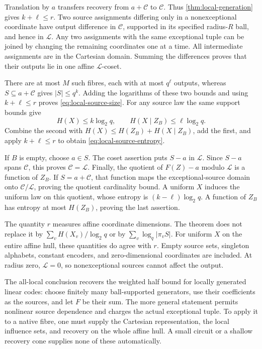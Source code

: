 \begin{informalproof}
Translation by $a$ transfers recovery from $a+\mathcal C$ to
$\mathcal C$. Thus \cref{thm:local-generation} gives $k+\ell\le r$.
Two source assignments differing only in a nonexceptional coordinate
have output difference in $\mathcal C$, supported in its specified
radius-$R$ ball, and hence in $\mathcal L$. Any two assignments with
the same exceptional tuple can be joined by changing the remaining
coordinates one at a time. All intermediate assignments are in the
Cartesian domain. Summing the differences proves that their outputs
lie in one affine $\mathcal L$-coset.

There are at most $M$ such fibres, each with at most $q^\ell$ outputs,
whereas $S\subseteq a+\mathcal C$ gives $|S|\le q^k$. Adding the
logarithms of these two bounds and using $k+\ell\le r$ proves
\eqref{eq:local-source-size}. For any source law the same support
bounds give
\[
 H(X)\le k\log_2q,\qquad
 H(X\mid Z_B)\le\ell\log_2q.
\]
Combine the second with $H(X)\le H(Z_B)+H(X\mid Z_B)$, add the first,
and apply $k+\ell\le r$ to obtain \eqref{eq:local-source-entropy}.

If $B$ is empty, choose $a\in S$. The coset assertion puts
$S-a$ in $\mathcal L$. Since $S-a$ spans $\mathcal C$, this proves
$\mathcal C=\mathcal L$. Finally, the quotient of $F(Z)-a$ modulo
$\mathcal L$ is a function of $Z_B$. If $S=a+\mathcal C$, that
function maps the exceptional-source domain onto
$\mathcal C/\mathcal L$, proving the quotient cardinality bound.
A uniform $X$ induces the uniform law on this quotient, whose entropy
is $(k-\ell)\log_2q$. A function of $Z_B$ has entropy at most
$H(Z_B)$, proving the last assertion.
\end{informalproof}

The quantity $r$ measures affine coordinate dimensions. The theorem
does not replace it by $\sum_v H(X_v)/\log_2q$ or by
$\sum_v\log_q|\pi_v S|$. For uniform $X$ on the entire affine hull,
these quantities do agree with $r$. Empty source sets, singleton
alphabets, constant encoders, and zero-dimensional coordinates are
included. At radius zero, $\mathcal L=0$, so nonexceptional sources
cannot affect the output.

The all-local conclusion recovers the weighted half bound for locally
generated linear codes: choose finitely many ball-supported generators,
use their coefficients as the sources, and let $F$ be their sum.
The more general statement permits nonlinear source dependence and
charges the actual exceptional tuple. To apply it to a native fibre,
one must supply the Cartesian representation, the local influence
sets, and recovery on the whole affine hull. A small circuit or a
shallow recovery cone supplies none of these automatically.

